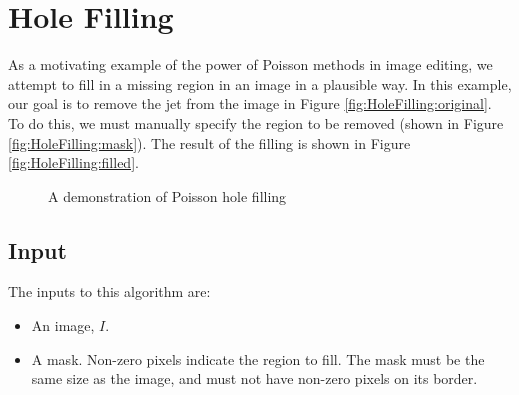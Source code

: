 \documentclass{InsightArticle}
\begin{document}
\section{Hole Filling}
As a motivating example of the power of Poisson methods in image editing, we attempt to fill in a missing region in an image in a plausible way. In this example, our goal is to remove the jet from the image in Figure \ref{fig:HoleFilling:original}. To do this, we must manually specify the region to be removed (shown in Figure \ref{fig:HoleFilling:mask}). The result of the filling is shown in Figure \ref{fig:HoleFilling:filled}.

\begin{figure}[H]
\centering
{}
\caption{A demonstration of Poisson hole filling}
\label{fig:HoleFilling}
\end{figure}

\subsection{Input}
The inputs to this algorithm are:
\begin{itemize}
\item An image, $I$.
\item A mask. Non-zero pixels indicate the region to fill. The mask must be the same size as the image, and must not have non-zero pixels on its border.
\end{itemize}
\end{document}

